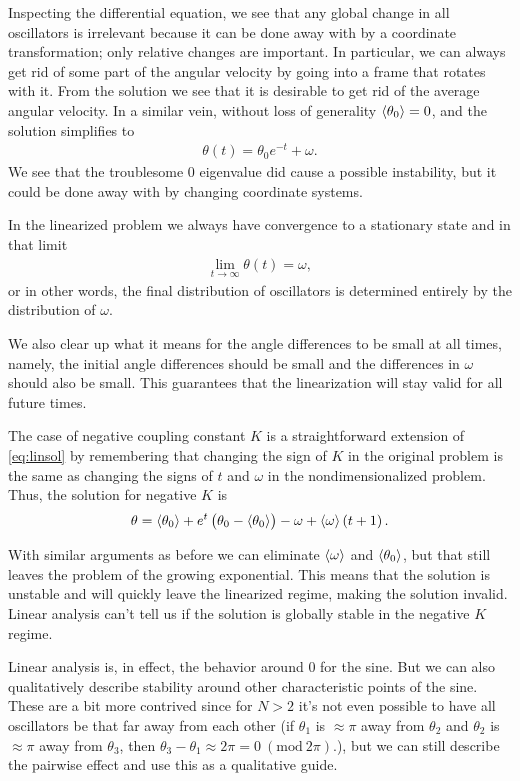 \documentclass[10pt,a4paper,twocolumn]{article}
\begin{document}
Inspecting the differential equation, we see that any global change  in all oscillators is irrelevant because it can be done away with by a coordinate transformation; only relative changes are important. In particular, we can always get rid of some part of the angular velocity by going into a frame that rotates with it. From the solution we see that it is desirable to get rid of the average angular velocity. In a similar vein, without loss of generality $\braket{\theta_0} = 0$, and the solution simplifies to
%
\begin{align}
    \theta(t) = \theta_0 e^{-t} + \omega. 
\end{align}
%
We see that the troublesome $0$ eigenvalue did cause a possible instability, but it could be done away with by changing coordinate systems.

In the linearized problem we always have convergence to a stationary state and in that limit
%
\begin{align}
    \lim_{t \rightarrow \infty} \theta (t) = \omega,
\end{align}
%
or in other words, the final distribution of oscillators is determined entirely by the distribution of $\omega$.

We also clear up what it means for the angle differences to be small at all times, namely, the initial angle differences should be small and the differences in $\omega$ should also be small. This guarantees that the linearization will stay valid for all future times.

The case of negative coupling constant $K$ is a straightforward extension of \cref{eq:linsol} by remembering that changing the sign of $K$ in the original problem is the same as changing the signs of $t$ and $\omega$ in the nondimensionalized problem. Thus, the solution for negative $K$ is
%
\begin{align}
    \theta = \braket{\theta_0} + e^{t} \left(\theta_0 - \braket{\theta_0}\right) - \omega + \braket{\omega} \left(t + 1\right).
\end{align}

With similar arguments as before we can eliminate $\braket{\omega}$ and $\braket{\theta_0}$, but that still leaves the problem of the growing exponential. This means that the solution is unstable and will quickly leave the linearized regime, making the solution invalid. Linear analysis can't tell us if the solution is globally stable in the negative $K$ regime. 


Linear analysis is, in effect, the behavior around $0$ for the sine. But we can also qualitatively describe stability around other characteristic points of the sine. These are a bit more contrived since for $N > 2$ it's not even possible to have all oscillators be that far away from each other (if $\theta_1$ is $\approx \pi$ away from $\theta_2$ and $\theta_2$ is $\approx \pi$ away from $\theta_3$, then $\theta_3 - \theta_1 \approx 2\pi = 0 \ (\text{mod} \ 2\pi)$.), but we can still describe the pairwise effect and use this as a qualitative guide.
\end{document}
